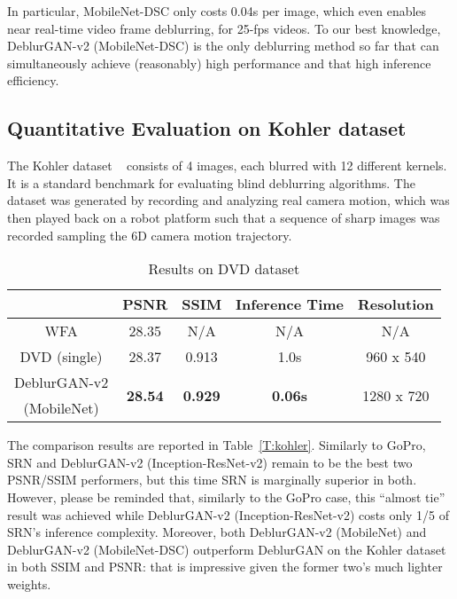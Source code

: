 \documentclass[10pt,twocolumn,letterpaper]{article}
\begin{document}
In particular, MobileNet-DSC only costs 0.04s per image, which even enables near real-time video frame deblurring, for 25-fps videos. To our best knowledge, DeblurGAN-v2 (MobileNet-DSC) is the only deblurring method so far that can simultaneously achieve (reasonably) high performance and that high inference efficiency. 









\subsection{Quantitative Evaluation on Kohler dataset}
\vspace{-0.5em}
The Kohler dataset ~\cite{Kohler} consists of 4 images, each blurred with 12 different kernels. It is a standard benchmark for evaluating blind deblurring algorithms. The dataset was generated by recording and analyzing real camera motion, which was then played back on a robot platform such that a sequence of sharp images was recorded sampling the 6D camera motion trajectory.

\begin{table}[tb]
\small
\caption{Results on DVD dataset}
\label{T:restore}
\vspace{-0.5em}
\centering
{}
\setlength\tabcolsep{3pt}
\begin{tabular}{ccccc}
\toprule
 & PSNR & SSIM & Inference Time & Resolution\\
 \hline
WFA & 28.35 &  N/A  & N/A & N/A \\
DVD (single) & 28.37 &  0.913  & 1.0s & 960 x 540 \\
DeblurGAN-v2 & \multirow{2}{*}{\textbf{28.54}} &  \multirow{2}{*}{\textbf{0.929}}  & \multirow{2}{*}{\textbf{0.06s}} & \multirow{2}{*}{1280 x 720}\\
(MobileNet)  &  \\
\bottomrule
\end{tabular}
\vspace{-1em}
\end{table}

The comparison results are reported in Table~\ref{T:kohler}. Similarly to GoPro, SRN and DeblurGAN-v2 (Inception-ResNet-v2) remain to be the best two PSNR/SSIM performers, but this time SRN is marginally superior in both. However, please be reminded that, similarly to the GoPro case, this ``almost tie'' result was achieved while DeblurGAN-v2 (Inception-ResNet-v2) costs only 1/5 of SRN's inference complexity. Moreover, both DeblurGAN-v2 (MobileNet) and DeblurGAN-v2 (MobileNet-DSC) outperform DeblurGAN on the Kohler dataset in both SSIM and PSNR: that is impressive given the former two's much lighter weights.
\end{document}

